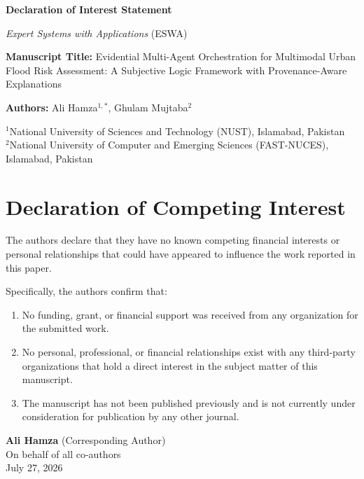 \documentclass[11pt,a4paper]{article}
\begin{document}
\thispagestyle{empty}

\begin{center}
{\Large \bf Declaration of Interest Statement \par}
\vspace{0.5em}
{\large \textit{Expert Systems with Applications} (ESWA) \par}
\end{center}

\vspace{2em}

\noindent \textbf{Manuscript Title:} Evidential Multi-Agent Orchestration for Multimodal Urban Flood Risk Assessment: A Subjective Logic Framework with Provenance-Aware Explanations

\vspace{1.5em}

\noindent \textbf{Authors:} Ali Hamza$^{1,*}$, Ghulam Mujtaba$^2$

\vspace{1em}

\noindent $^1$National University of Sciences and Technology (NUST), Islamabad, Pakistan \\
$^2$National University of Computer and Emerging Sciences (FAST-NUCES), Islamabad, Pakistan

\vspace{2em}

\section*{Declaration of Competing Interest}

\noindent The authors declare that they have no known competing financial interests or personal relationships that could have appeared to influence the work reported in this paper.

\vspace{1.5em}

\noindent Specifically, the authors confirm that:
\begin{enumerate}
    \item No funding, grant, or financial support was received from any organization for the submitted work.
    \item No personal, professional, or financial relationships exist with any third-party organizations that hold a direct interest in the subject matter of this manuscript.
    \item The manuscript has not been published previously and is not currently under consideration for publication by any other journal.
\end{enumerate}

\vspace{3em}

\begin{flushleft}
\textbf{Ali Hamza} (Corresponding Author) \\
On behalf of all co-authors \\
July 27, 2026
\end{flushleft}
\end{document}
